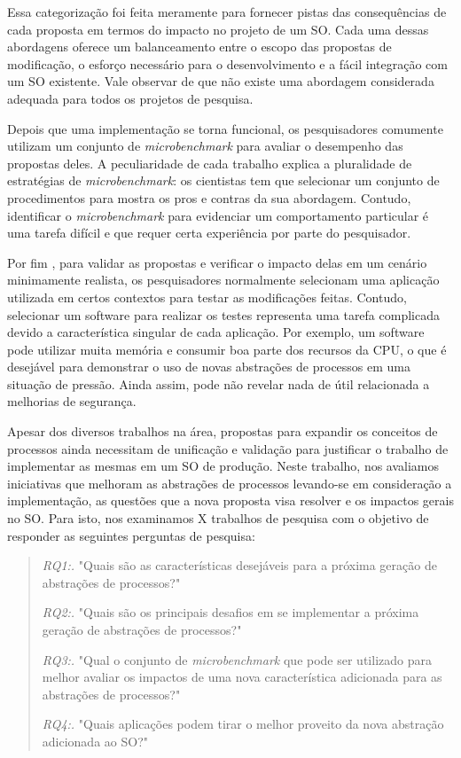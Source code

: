 Essa categorização foi feita meramente para fornecer pistas das consequências
de cada proposta em termos do impacto no projeto de um SO. Cada uma dessas
abordagens oferece um balanceamento entre o escopo das propostas de
modificação, o esforço necessário para o desenvolvimento e a fácil integração
com um SO existente. Vale observar de que não existe uma abordagem considerada
adequada para todos os projetos de pesquisa.

Depois que uma implementação se torna funcional, os pesquisadores comumente
utilizam um conjunto de \emph{microbenchmark} para avaliar o desempenho das
propostas deles. A peculiaridade de cada trabalho explica a pluralidade de
estratégias de \emph{microbenchmark}: os cientistas tem que selecionar um
conjunto de procedimentos para mostra os pros e contras da sua abordagem.
Contudo, identificar o \emph{microbenchmark} para evidenciar um comportamento
particular é uma tarefa difícil e que requer certa experiência por parte do
pesquisador.

Por fim , para validar as propostas e verificar o impacto delas em um cenário
minimamente realista, os pesquisadores normalmente selecionam uma aplicação
utilizada em certos contextos para testar as modificações feitas. Contudo,
selecionar um software para realizar os testes representa uma tarefa complicada
devido a característica singular de cada aplicação. Por exemplo, um software
pode utilizar muita memória e consumir boa parte dos recursos da CPU, o que é
desejável para demonstrar o uso de novas abstrações de processos em uma
situação de pressão. Ainda assim, pode não revelar nada de útil relacionada a
melhorias de segurança.

Apesar dos diversos trabalhos na área, propostas para expandir os conceitos de
processos ainda necessitam de unificação e validação para justificar o trabalho
de implementar as mesmas em um SO de produção. Neste trabalho, nos avaliamos
iniciativas que melhoram as abstrações de processos levando-se em consideração
a implementação, as questões que a nova proposta visa resolver e os impactos
gerais no SO. Para isto, nos examinamos X trabalhos de pesquisa com o objetivo
de responder as seguintes perguntas de pesquisa:

\begin{quote}
 \item \textit{RQ1:.} "Quais são as características desejáveis para a próxima geração de abstrações de processos?"
 \item \textit{RQ2:.} "Quais são os principais desafios em se implementar a próxima geração de abstrações de processos?"
 \item \textit{RQ3:.} "Qual o conjunto de \emph{microbenchmark} que pode ser utilizado para melhor avaliar os impactos de uma nova característica adicionada para as abstrações de processos?"
 \item \textit{RQ4:.} "Quais aplicações podem tirar o melhor proveito da nova abstração adicionada ao SO?"
\end{quote}


